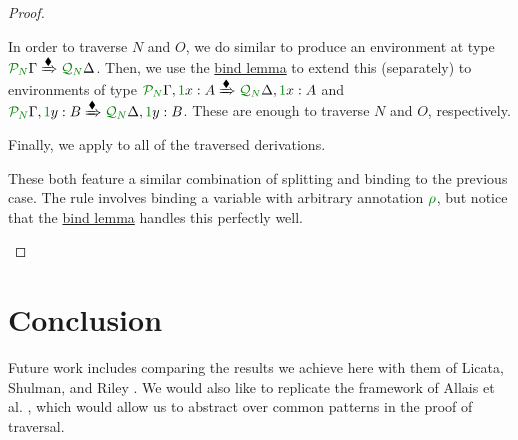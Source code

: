 \documentclass[submission,copyright,creativecommons]{eptcs}
\begin{document}
\begin{proof}
\begin{description}
      In order to traverse $N$ and $O$, we do similar to produce an environment
      at type
      $\ctx{\Gamma}{P_{\mathnormal N}}
      \subst{\kitrel} \ctx{\Delta}{Q_{\mathnormal N}}$.
      Then, we use the \hyperref[lem:bind]{bind lemma} to extend this
      (separately) to environments of type
      $\ctx{\Gamma}{P_{\mathnormal N}}, \ctxvar{x}{A}{1}
      \subst{\kitrel} \ctx{\Delta}{Q_{\mathnormal N}}, \ctxvar{x}{A}{1}$ and
      $\ctx{\Gamma}{P_{\mathnormal N}}, \ctxvar{y}{B}{1}
      \subst{\kitrel} \ctx{\Delta}{Q_{\mathnormal N}}, \ctxvar{y}{B}{1}$.
      These are enough to traverse $N$ and $O$, respectively.

      Finally, we apply  to all of the traversed
      derivations.
    \item[\TirName{$\tensor{}{}$-E}, \TirName{$\excl{\rho}{}$-E}:]
      These both feature a similar combination of splitting and binding to the
      previous case.
      The  rule involves binding a variable with
      arbitrary annotation $\rescomment\rho$, but notice that the
      \hyperref[lem:bind]{bind lemma} handles this perfectly well.
  \end{description}
\end{proof}

\section{Conclusion}\label{sec:conclusion}

Future work includes comparing the results we achieve here with them of Licata,
Shulman, and Riley \cite{LicataSR17}.
We would also like to replicate the framework of Allais et al. \cite{AACMM20},
which would allow us to abstract over common patterns in the proof of traversal.



\end{document}
